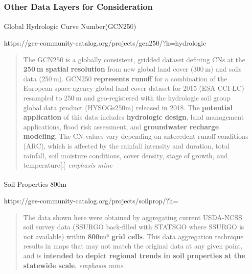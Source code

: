 \documentclass[
]{agujournal2019}
\makeatletter
\let\oldparagraph\paragraph
\renewcommand{\paragraph}{
    \@ifstar
      \xxxParagraphStar
      \xxxParagraphNoStar
  }
\newcommand{\xxxParagraphStar}[1]{\oldparagraph*{#1}\mbox{}}
\newcommand{\xxxParagraphNoStar}[1]{\oldparagraph{#1}\mbox{}}
\makeatother
\begin{document}
\subsubsection{Other Data Layers for
Consideration}\label{other-data-layers-for-consideration}

\paragraph{Global Hydrologic Curve
Number(GCN250)}\label{global-hydrologic-curve-numbergcn250}

https://gee-community-catalog.org/projects/gcn250/?h=hydrologic

\begin{quote}
The GCN250 is a globally consistent, gridded dataset defining CNs at the
\textbf{250 m spatial resolution} from new global land cover (300 m) and
soils data (250 m). GCN250 \textbf{represents runoff} for a combination
of the European space agency global land cover dataset for 2015 (ESA
CCI-LC) resampled to 250 m and geo-registered with the hydrologic soil
group global data product (HYSOGs250m) released in 2018. The
\textbf{potential application} of this data includes \textbf{hydrologic
design}, land management applications, flood risk assessment, and
\textbf{groundwater recharge modeling}. The CN values vary depending on
antecedent runoff conditions (ARC), which is affected by the rainfall
intensity and duration, total rainfall, soil moisture conditions, cover
density, stage of growth, and temperature{[}.{]} \emph{emphasis mine}
\end{quote}

\paragraph{Soil Properties 800m}\label{soil-properties-800m}

https://gee-community-catalog.org/projects/soilprop/?h=

\begin{quote}
The data shown here were obtained by aggregating current USDA-NCSS soil
survey data (SSURGO back-filled with STATSGO where SSURGO is not
available) within \textbf{800m² grid cells}. This data aggregation
technique results in maps that may not match the original data at any
given point, and is \textbf{intended to depict regional trends in soil
properties at the statewide scale}. \emph{emphasis mine}
\end{quote}
\end{document}
